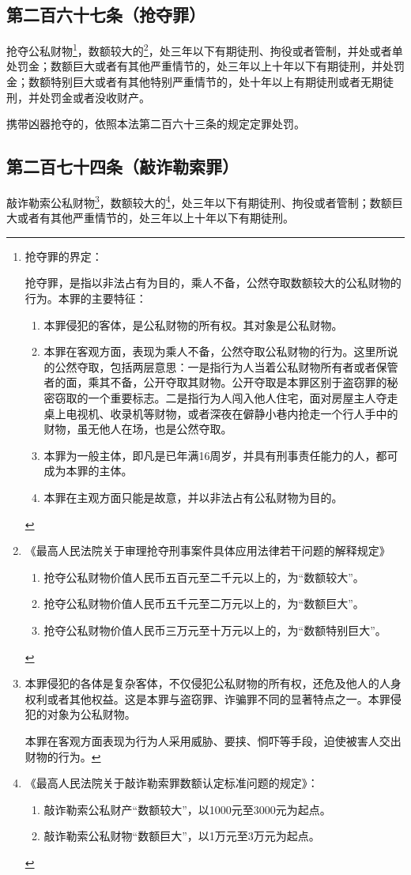 \documentclass[utf-8,10pt]{ctexart}
\begin{document}
\subsection{第二百六十七条（抢夺罪）}
抢夺公私财物\footnote{
抢夺罪的界定：

抢夺罪，是指以非法占有为目的，乘人不备，公然夺取数额较大的公私财物的行为。本罪的主要特征：
\begin{enumerate}
\item 本罪侵犯的客体，是公私财物的所有权。其对象是公私财物。
\item 本罪在客观方面，表现为乘人不备，公然夺取公私财物的行为。这里所说的公然夺取，包括两层意思：一是指行为人当着公私财物所有者或者保管者的面，乘其不备，公开夺取其财物。公开夺取是本罪区别于盗窃罪的秘密窃取的一个重要标志。二是指行为人闯入他人住宅，面对房屋主人夺走桌上电视机、收录机等财物，或者深夜在僻静小巷内抢走一个行人手中的财物，虽无他人在场，也是公然夺取。
\item 本罪为一般主体，即凡是已年满16周岁，并具有刑事责任能力的人，都可成为本罪的主体。
\item 本罪在主观方面只能是故意，并以非法占有公私财物为目的。
\end{enumerate}
}，数额较大的\footnote{
《最高人民法院关于审理抢夺刑事案件具体应用法律若干问题的解释规定》
\begin{enumerate}
\item 抢夺公私财物价值人民币五百元至二千元以上的，为“数额较大”。
\item 抢夺公私财物价值人民币五千元至二万元以上的，为“数额巨大”。
\item 抢夺公私财物价值人民币三万元至十万元以上的，为“数额特别巨大”。
\end{enumerate}
}，处三年以下有期徒刑、拘役或者管制，并处或者单处罚金；数额巨大或者有其他严重情节的，处三年以上十年以下有期徒刑，并处罚金；数额特别巨大或者有其他特别严重情节的，处十年以上有期徒刑或者无期徒刑，并处罚金或者没收财产。

携带凶器抢夺的，依照本法第二百六十三条的规定定罪处罚。
\subsection{第二百七十四条（敲诈勒索罪）}
敲诈勒索公私财物\footnote{
本罪侵犯的各体是复杂客体，不仅侵犯公私财物的所有权，还危及他人的人身权利或者其他权益。这是本罪与盗窃罪、诈骗罪不同的显著特点之一。本罪侵犯的对象为公私财物。

本罪在客观方面表现为行为人采用威胁、要挟、恫吓等手段，迫使被害人交出财物的行为。
}，数额较大的\footnote{
《最高人民法院关于敲诈勒索罪数额认定标准问题的规定》：
\begin{enumerate}
\item 敲诈勒索公私财产“数额较大”，以1000元至3000元为起点。
\item 敲诈勒索公私财物“数额巨大”，以1万元至3万元为起点。
\end{enumerate}
}，处三年以下有期徒刑、拘役或者管制；数额巨大或者有其他严重情节的，处三年以上十年以下有期徒刑。
\end{document}
